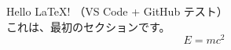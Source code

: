 \documentclass{article}
\begin{document}
Hello LaTeX! （VS Code + GitHub テスト）\\
これは、最初のセクションです。
\[E=mc^2\]
\end{document}
